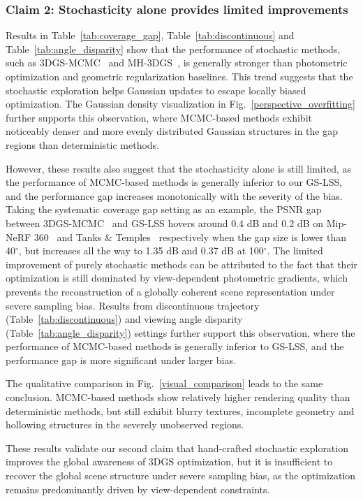 \documentclass[lettersize,journal]{IEEEtran}
\begin{document}
\subsubsection{Claim 2: Stochasticity alone provides limited improvements}

Results in Table~\ref{tab:coverage_gap}, Table~\ref{tab:discontinuous} and Table~\ref{tab:angle_disparity} show that 
the performance of stochastic methods, such as 3DGS-MCMC~\cite{mcmc} and MH-3DGS~\cite{mh3dgs}, is generally stronger than photometric optimization and geometric regularization baselines. This trend suggests that the stochastic exploration 
helps Gaussian updates to escape locally biased optimization. 
The Gaussian density visualization in Fig.~\ref{perspective_overfitting} further supports this observation, where MCMC-based methods exhibit noticeably denser and more evenly distributed Gaussian structures in the gap regions than deterministic methods.

However, these results also suggest that the stochasticity alone is still limited, as the performance of MCMC-based methods is generally inferior to our GS-LSS, and the performance gap increases monotonically with the severity of the bias.
Taking the systematic coverage gap setting as an example, the PSNR gap between 3DGS-MCMC~\cite{mcmc} and GS-LSS hovers around 0.4 dB and 0.2 dB on Mip-NeRF 360~\cite{mipnerf360} and Tanks \& Temples~\cite{tankstemples} respectively when the gap size is lower than 40$^\circ$, but increases all the way to 1.35 dB and 0.37 dB at 100$^\circ$. 
The limited improvement of purely stochastic methods can be attributed to the fact that their optimization is still dominated by view-dependent photometric gradients, which prevents the reconstruction of a globally coherent scene representation under severe sampling bias.
Results from discontinuous trajectory (Table~\ref{tab:discontinuous}) and viewing angle disparity (Table~\ref{tab:angle_disparity}) settings 
further support this observation, where the performance of MCMC-based methods is generally inferior to GS-LSS, and the performance gap is more significant under larger bias.

The qualitative comparison in Fig.~\ref{visual_comparison} leads to the same conclusion. 
MCMC-based methods show relatively higher rendering quality than deterministic methods, 
but still exhibit blurry textures, incomplete geometry and hollowing structures in the severely unobserved regions. 

These results validate our second claim that hand-crafted stochastic exploration improves the global awareness of 3DGS optimization, but it is insufficient to recover the global scene structure under severe sampling bias, as the optimization remains predominantly driven by view-dependent constraints.
\end{document}
